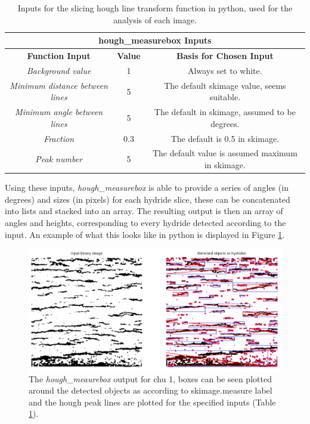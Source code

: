 \documentclass{article}
\begin{document}
    \begin{table}[h]
	    \begin{center}
	    \begin{tabular}{ |c|c|c| } 
		    \hline
		    \multicolumn{3}{|c|}{\textbf{hough\_measurebox Inputs}} \\
		    \hline
		    \textbf{Function Input} & \textbf{Value} & \textbf{Basis for Chosen Input} \\
		    \hline
		    \textit{Background value} & 1 & Always set to white. \\
		    \hline
		    \textit{Minimum distance between lines} & 5 & The default skimage value, seems suitable. \\ 
		    \hline
		    \textit{Minimum angle between lines} & 5 & The default in skimage, assumed to be degrees. \\
		    \hline
		    \textit{Fraction} & 0.3 & The default is 0.5 in skimage. \\ 
		    \hline
		    \textit{Peak number} & 5 & The default value is assumed maximum in skimage. \\ 
		    \hline
	    \end{tabular}
	    \caption{Inputs for the slicing hough line transform function in python, used for the analysis of each image.}
	    \label{HoughmeasureboxInputs}
	    \end{center}
    \end{table}
    
    Using these inputs, \textit{hough\_measurebox} is able to provide a series of angles (in degrees) and sizes (in pixels) for each hydride slice, these can be concatenated into lists and stacked into an array. The resulting output is then an array of angles and heights, corresponding to every hydride detected according to the input. An example of what this looks like in python is displayed in Figure \ref{fig:houghmeasure_chu1}.
    
    \begin{figure}[h]
        \centering
        \includegraphics[scale=0.5]{Figures/houghmeasure_chu1.PNG}
        \caption{The \textit{hough\_meaurebox} output for chu 1, boxes can be seen plotted around the detected objects as according to skimage.measure label and the hough peak lines are plotted for the specified inputs (Table \ref{HoughmeasureboxInputs}).}
        \label{fig:houghmeasure_chu1}
    \end{figure}
    
\end{document}
